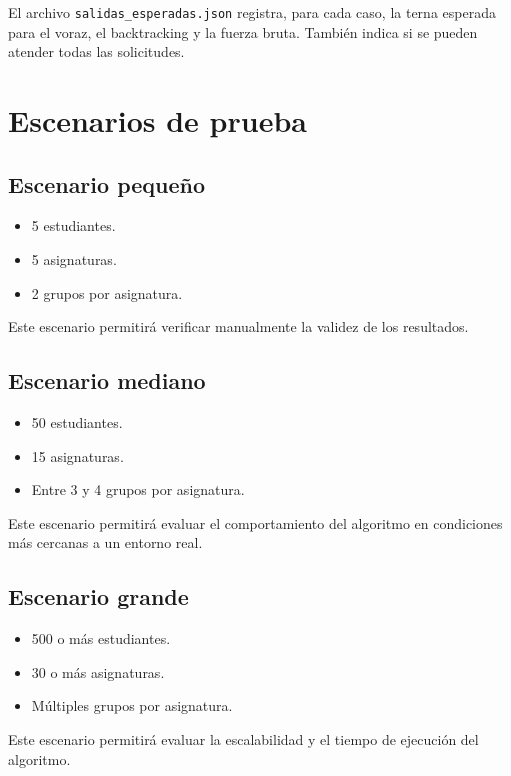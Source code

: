 \documentclass[11pt]{article}
\numberwithin{equation}{section}
\numberwithin{figure}{section}
\numberwithin{table}{section}
\theoremstyle{definition}
\begin{document}
El archivo \texttt{salidas\_esperadas.json} registra, para cada caso,
la terna esperada para el voraz, el backtracking y la fuerza bruta. También
indica si se pueden atender todas las solicitudes.

\section{Escenarios de prueba}

\subsection{Escenario pequeño}

\begin{itemize}
  \item 5 estudiantes.
  \item 5 asignaturas.
  \item 2 grupos por asignatura.
\end{itemize}

Este escenario permitirá verificar manualmente la validez de los resultados.

\subsection{Escenario mediano}

\begin{itemize}
  \item 50 estudiantes.
  \item 15 asignaturas.
  \item Entre 3 y 4 grupos por asignatura.
\end{itemize}

Este escenario permitirá evaluar el comportamiento del algoritmo en
condiciones más cercanas a un entorno real.

\subsection{Escenario grande}

\begin{itemize}
  \item 500 o más estudiantes.
  \item 30 o más asignaturas.
  \item Múltiples grupos por asignatura.
\end{itemize}

Este escenario permitirá evaluar la escalabilidad y el tiempo de ejecución del
algoritmo.
\end{document}
